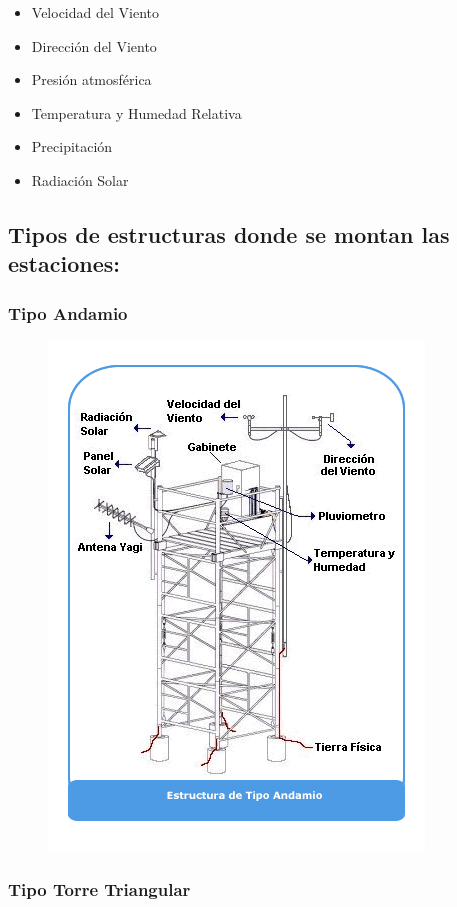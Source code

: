\documentclass{article}
\begin{document}
\begin{itemize}
    \item Velocidad del Viento
    \item Dirección del Viento
    \item Presión atmosférica
    \item Temperatura y Humedad Relativa
    \item Precipitación
    \item Radiación Solar
\end{itemize}

\subsection{Tipos de estructuras donde se montan las estaciones:}

\subsubsection{Tipo Andamio}

\begin{figure}[h]
    \centering
    \includegraphics[scale=0.42]{Estacion1.png}
    \label{fig:my_label}
\end{figure}

\subsubsection{Tipo Torre Triangular}
\end{document}
